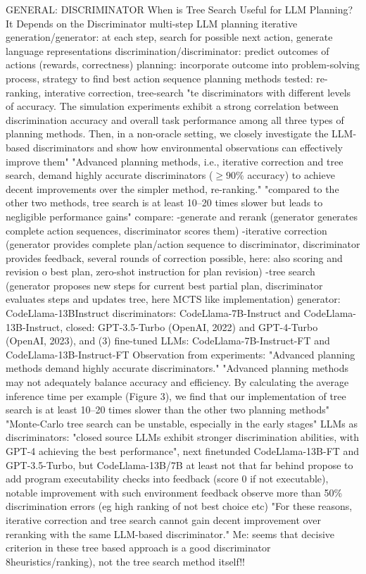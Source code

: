 \documentclass{article}
\begin{document}
GENERAL: DISCRIMINATOR
\cite{chen_when_2024} When is Tree Search Useful for LLM Planning? It Depends on the Discriminator
multi-step LLM planning
iterative generation/generator: at each step, search for possible next action, generate language representations
discrimination/discriminator: predict outcomes of actions (rewards, correctness)
planning: incorporate outcome into problem-solving process, strategy to find best action sequence
planning methods tested: re-ranking, interative correction, tree-search
"te discriminators with different levels of accuracy. The simulation experiments exhibit a strong correlation between discrimination accuracy and overall task performance among all three types of planning methods. Then, in a non-oracle setting, we closely investigate the LLM-based discriminators and show how environmental observations can effectively improve them"
"Advanced planning methods, i.e., iterative correction and tree search, demand highly accurate discriminators ($\geq 90\%$ accuracy) to achieve decent improvements over the simpler method, re-ranking."
"compared to the other two methods, tree search is at least 10–20 times slower but leads to negligible performance gains"
compare:
-generate and rerank (generator generates complete action sequences, discriminator scores them)
-iterative correction (generator provides complete plan/action sequence to discriminator, discriminator provides feedback, several rounds of correction possible, here: also scoring and revision o best plan, zero-shot instruction for plan revision)
-tree search (generator proposes new steps for current best partial plan, discriminator evaluates steps and updates tree, here MCTS like implementation)
generator:  CodeLlama-13BInstruct
discriminators: CodeLlama-7B-Instruct and CodeLlama-13B-Instruct, closed: GPT-3.5-Turbo (OpenAI, 2022) and GPT-4-Turbo (OpenAI, 2023), and (3) fine-tuned LLMs: CodeLlama-7B-Instruct-FT and CodeLlama-13B-Instruct-FT
Observation from experiments:
"Advanced planning methods demand highly accurate discriminators."
"Advanced planning methods may not adequately balance accuracy and efficiency. By calculating the average inference time per example (Figure 3), we find that our implementation of tree search is at least 10–20 times slower than the other two planning methods"
"Monte-Carlo tree search can be unstable, especially in the early stages"
LLMs as discriminators: "closed source LLMs exhibit stronger discrimination abilities, with GPT-4 achieving the best performance", next finetunded CodeLlama-13B-FT and GPT-3.5-Turbo, but CodeLlama-13B/7B at least not that far behind
propose to add program executability checks into feedback (score 0 if not executable), notable improvement with such environment feedback
observe more than 50\% discrimination errors (eg high ranking of not best choice etc)
"For these reasons, iterative correction and tree search cannot gain decent improvement over reranking with the same LLM-based discriminator."
Me: seems that decisive criterion in these tree based approach is a good discriminator 8heuristics/ranking), not the tree search method itself!!
\end{document}
